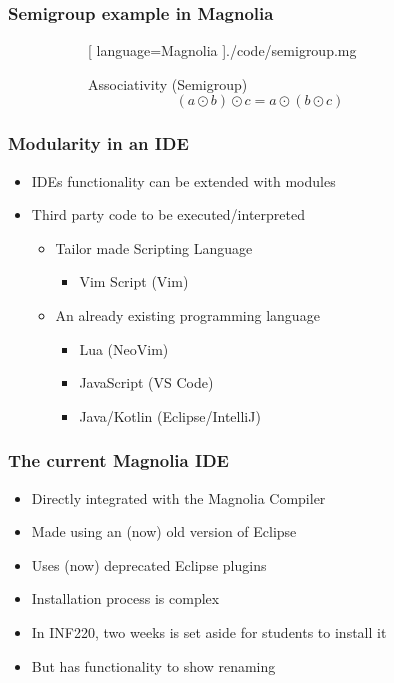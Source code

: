 \begin{frame}
  \frametitle{Semigroup example in Magnolia}
  \begin{figure}[H]
    \begin{subfigure}[h]{0.45\textwidth}
  \begin{center}
    
    [ language=Magnolia
    ]{./code/semigroup.mg}
  \end{center}
    \end{subfigure}
    \hfill
    \begin{subfigure}[h]{0.45\textwidth}
      Associativity (Semigroup)
      \begin{equation}
        (a \odot b) \odot c = a \odot (b \odot c)
      \end{equation}
    \end{subfigure}
  \end{figure}
\end{frame}

\begin{frame}
  \frametitle{Modularity in an IDE}
  \begin{itemize}
    \item IDEs functionality can be extended with modules
    \item Third party code to be executed/interpreted
      \begin{itemize}
        \item Tailor made Scripting Language
          \begin{itemize}
            \item Vim Script (Vim)
          \end{itemize}
        \item An already existing programming language
          \begin{itemize}
            \item Lua (NeoVim)
            \item JavaScript (VS Code)
            \item Java/Kotlin (Eclipse/IntelliJ)
          \end{itemize}
      \end{itemize}
  \end{itemize}
\end{frame}

\begin{frame}
  \frametitle{The current Magnolia IDE}
  \begin{itemize}
    \item Directly integrated with the Magnolia Compiler
    \item Made using an (now) old version of Eclipse
    \item Uses (now) deprecated Eclipse plugins
    \item Installation process is complex
    \item In INF220, two weeks is set aside for students to install it
    \item But has functionality to show renaming
  \end{itemize}
\end{frame}
